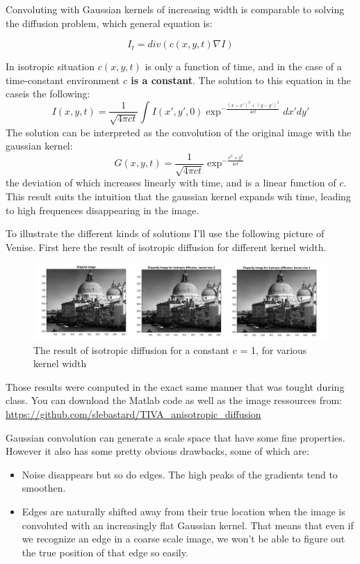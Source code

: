 \documentclass[12pt,a4paper]{article}
\begin{document}
Convoluting with Gaussian kernels of increasing width is comparable to solving the diffusion problem, which general equation is:

\begin{equation}
I_{t} = div(c(x,y,t) \nabla I)
\end{equation}

In isotropic situation $c(x,y,t)$ is only a function of time, and in the case of a time-constant environment \textbf{$c$ is a constant}.
The solution to this equation in the caseis the following:
\begin{equation}
I(x,y,t)=\frac{1}{\sqrt{4 \pi c t}}\int_{ }^{ } I(x',y',0)\exp^{-\frac{(x-x')^{2} + (y-y')^{2}}{4ct}}dx'dy'
\end{equation}
The solution can be interpreted as the convolution of the original image with the gaussian kernel:
\begin{equation}
G(x,y,t)=\frac{1}{\sqrt{4 \pi c t}}\exp^{-\frac{x^{2} + y^{2}}{4ct}}
\end{equation}
the deviation of which increases linearly with time, and is a linear function of $c$.
This result suits the intuition that the gaussian kernel expands wih time, leading to high frequences disappearing in the image.


To illustrate the different kinds of solutions I'll use the following picture of Venise. First here the result of isotropic diffusion for different kernel width.
\begin{figure}[h]
	\centering
	\includegraphics[scale=0.6]{isotropic_diffusion.jpg}
	\caption{The result of isotropic diffusion for a constant c = 1, for various kernel width}
\end{figure}
Those results were computed in the exact same manner that was tought during class. You can download the Matlab code as well as the image ressources from:
\url{https://github.com/slebastard/TIVA\_anisotropic\_diffusion}

Gaussian convolution can generate a scale space that have some fine properties. However it also has some pretty obvious drawbacks, some of which are:
\begin{itemize}
	\item Noise disappears but so do edges. The high peaks of the gradients tend to smoothen.
	\item Edges are naturally shifted away from their true location when the image is convoluted with an increasingly flat Gaussian kernel. That means that even if we recognize an edge in a coarse scale image, we won't be able to figure out the true position of that edge so easily.
\end{itemize}
\end{document}
